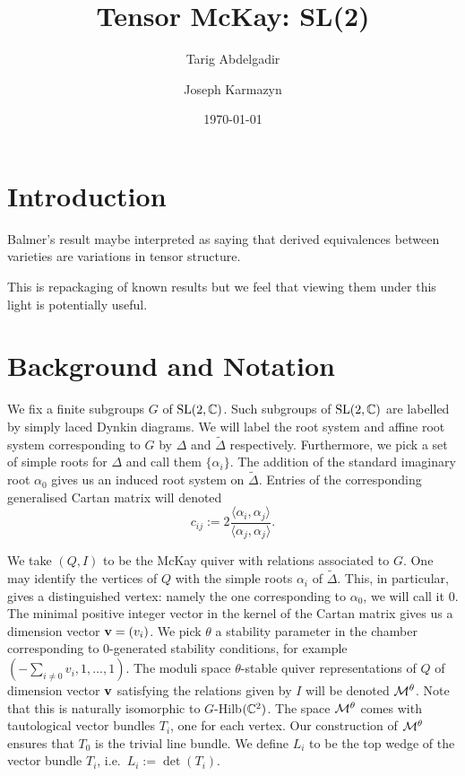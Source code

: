 \documentclass{amsart}
\title{Tensor McKay: SL(2)}
\author{Tarig Abdelgadir}
\author{Joseph Karmazyn}
\date{\today}
\theoremstyle{definition}
\begin{document}
\maketitle

\section{Introduction}
Balmer's result maybe interpreted as saying that derived equivalences between varieties are variations in tensor structure.

This is repackaging of known results but we feel that viewing them under this light is potentially useful. 

\section{Background and Notation}

We fix a finite subgroups $G$ of $\operatorname{SL}(2,\mathbb{C})$.
Such subgroups of $\operatorname{SL}(2,\mathbb{C})$ are labelled by simply laced Dynkin diagrams.
We will label the root system and affine root system corresponding to $G$ by $\Delta$ and $\tilde{\Delta}$ respectively.
Furthermore, we pick a set of simple roots for $\Delta$ and call them $\{\alpha_i\}$.
The addition of the standard imaginary root $\alpha_0$ gives us an induced root system on $\tilde{\Delta}$.
Entries of the corresponding generalised Cartan matrix will denoted
$$c_{ij} := 2 \frac{\langle \alpha_i, \alpha_j\rangle}{\langle \alpha_j, \alpha_j\rangle}.$$

We take $(Q,I)$ to be the McKay quiver with relations associated to $G$.
One may identify the vertices of $Q$ with the simple roots $\alpha_i$ of $\tilde{\Delta}$.
This, in particular, gives a distinguished vertex: namely the one corresponding to $\alpha_0$, we will call it $0$.
The minimal positive integer vector in the kernel of the Cartan matrix gives us a dimension vector $\mathbf{v}=(v_i)$.
We pick $\theta$ a stability parameter in the chamber corresponding to 0-generated stability conditions, for example $(-\sum_{i \neq 0} v_i,1, \ldots,1)$.
The moduli space $\theta$-stable quiver representations of $Q$ of dimension vector $\mathbf{v}$ satisfying the relations given by $I$ will be denoted $\mathcal{M}^\theta$.
Note that this is naturally isomorphic to $G$-Hilb$(\mathbb{C}^2)$.
The space $\mathcal{M}^\theta$ comes with tautological vector bundles $T_i$, one for each vertex.
Our construction of $\mathcal{M}^\theta$ ensures that $T_0$ is the trivial line bundle.
We define $L_i$ to be the top wedge of the vector bundle $T_i$, i.e.\ $L_i := \det(T_i)$.
\end{document}
